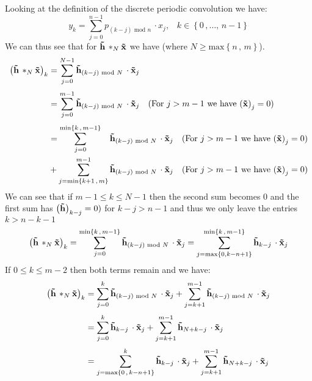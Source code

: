 \documentclass{article}
\begin{document}
Looking at the definition of the discrete periodic convolution we have:
\begin{equation*}
    y_{k} = \sum_{j=0}^{n-1}p_{\left(k-j\right) \text{ mod } n} \, \cdot x_{j} \text{,} \quad k \in \left\{0 \,,\dots,\,n-1\right\}
\end{equation*}
We can thus see that for $\mathbf{\Tilde{h}}\, *_{N}\mathbf{\Tilde{x}}$ we have (where $N \geq \text{max}\left\{n\,,\,m\right\}$).
\begin{align*}
\left(\mathbf{\Tilde{h}}\, *_{N}\mathbf{\Tilde{x}}\right)_{k} &= 
    \sum_{j=0}^{N-1}\mathbf{\Tilde{h}}_{\left(k-j\right) \text{ mod } N} \, \cdot \mathbf{\Tilde{x}}_{j} \\[1mm]
    &= \sum_{j=0}^{m-1}\mathbf{\Tilde{h}}_{\left(k-j\right) \text{ mod } N} \, \cdot \mathbf{\Tilde{x}}_{j} \quad \text{(For $j > m - 1$ we have $\left(\mathbf{\Tilde{x}}\right)_{j}=0)$} \\[1mm]
    &= \sum_{j=0}^{\text{min}\left\{k \,,\,m-1\right\}} \hspace{8.55px}\mathbf{\Tilde{h}}_{\left(k-j\right) \text{ mod } N} \, \cdot \mathbf{\Tilde{x}}_{j} \quad \text{(For $j > m - 1$ we have $\left(\mathbf{\Tilde{x}}\right)_{j}=0)$} \\
    &+ \sum_{j=\text{min}\left\{k + 1 \,,\,m\right\}}^{m-1} \mathbf{\Tilde{h}}_{\left(k-j\right) \text{ mod } N} \, \cdot \mathbf{\Tilde{x}}_{j} \quad \text{(For $j > m - 1$ we have $\left(\mathbf{\Tilde{x}}\right)_{j}=0)$}
\end{align*}
We can see that if $m-1 \leq k \leq N-1$ then the second sum becomes 0 and the first sum has $\left(\mathbf{\Tilde{h}}\right)_{k-j}=0)$ for $k -j > n - 1$ and thus we only leave the entries $k > n -k - 1$
\begin{equation*}
    \left(\mathbf{\Tilde{h}}\, *_{N}\mathbf{\Tilde{x}}\right)_{k} = \sum_{j=0}^{\text{min}\left\{k \,,\,m-1\right\}} \mathbf{\Tilde{h}}_{\left(k-j\right) \text{ mod } N} \, \cdot \mathbf{\Tilde{x}}_{j} =\sum_{j=\text{max}\left\{0, k - n + 1\right\}}^{\text{min}\left\{k \,,\,m-1\right\}} \mathbf{\Tilde{h}}_{k-j} \, \cdot \mathbf{\Tilde{x}}_{j}
\end{equation*}
If $0 \leq k \leq m - 2$ then both terms remain and we have:
\begin{align*}
\left(\mathbf{\Tilde{h}}\, *_{N}\mathbf{\Tilde{x}}\right)_{k} &= \sum_{j=0}^{k} \mathbf{\Tilde{h}}_{\left(k-j\right) \text{ mod } N} \, \cdot \mathbf{\Tilde{x}}_{j}  + \sum_{j=k + 1}^{m-1} \mathbf{\Tilde{h}}_{\left(k-j\right) \text{ mod } N} \, \cdot \mathbf{\Tilde{x}}_{j} \\[1mm]
&= \sum_{j=0}^{k} \mathbf{\Tilde{h}}_{k-j} \, \cdot \mathbf{\Tilde{x}}_{j}  + \sum_{j=k + 1}^{m-1} \mathbf{\Tilde{h}}_{N + k - j} \, \cdot \mathbf{\Tilde{x}}_{j} \\[1mm]
&= \sum_{j=\text{max}\left\{0\,,\,k-n+1\right\}}^{k} \mathbf{\Tilde{h}}_{k-j} \, \cdot \mathbf{\Tilde{x}}_{j}  + \sum_{j=k + 1}^{m-1} \mathbf{\Tilde{h}}_{N + k - j} \, \cdot \mathbf{\Tilde{x}}_{j}
\end{align*}
\end{document}
